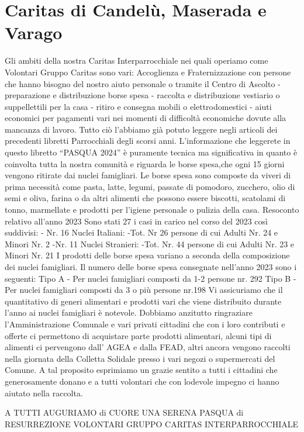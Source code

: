 \section{Caritas di Candelù, Maserada e Varago}
Gli ambiti della nostra Caritas Interparrocchiale nei quali operiamo come Volontari Gruppo Caritas sono vari: Accoglienza e Fraternizzazione con persone che hanno bisogno del nostro aiuto personale o tramite il Centro di Ascolto - preparazione e distribuzione borse spesa - raccolta e distribuzione vestiario o suppellettili per la casa - ritiro e consegna mobili o elettrodomestici - aiuti economici per pagamenti vari nei momenti di difficoltà economiche dovute alla mancanza di lavoro.                         
Tutto ciò l’abbiamo già potuto leggere negli articoli dei precedenti libretti Parrocchiali degli scorsi anni.
L’informazione che leggerete in questo libretto “PASQUA 2024” è puramente tecnica ma significativa in quanto è coinvolta  tutta la nostra comunità e riguarda le borse spesa,che ogni 15 giorni vengono ritirate dai nuclei famigliari.
Le borse spesa sono composte da viveri di prima necessità come pasta, latte, legumi, passate di pomodoro, zucchero, olio di semi e oliva, farina o da altri alimenti che possono essere biscotti, scatolami di tonno, marmellate e prodotti per l’igiene personale o pulizia della casa.
Resoconto relativo all’anno  2023
Sono stati 27 i casi in carico nel corso del 2023 così suddivisi:
- Nr. 16 Nuclei Italiani:
-Tot. Nr  26 persone di cui Adulti Nr. 24  e Minori Nr. 2
-Nr. 11 Nuclei Stranieri:
-Tot. Nr. 44 persone di cui Adulti Nr. 23 e  Minori Nr. 21
I prodotti delle borse spesa variano a seconda della composizione dei nuclei famigliari.
Il numero delle borse spesa consegnate nell’anno 2023 sono i seguenti:
Tipo A - Per nuclei famigliari composti da 1-2 persone nr. 292
Tipo B - Per nuclei famigliari composti da 3 o più persone nr.198
Vi assicuriamo che il quantitativo di generi alimentari e prodotti vari che viene distribuito durante l’anno ai nuclei famigliari è notevole.
Dobbiamo anzitutto ringraziare l’Amministrazione Comunale e vari privati cittadini che con i loro contributi e offerte ci permettono di acquistare parte prodotti alimentari, alcuni tipi di alimenti ci pervengono dall’ AGEA e dalla FEAD, altri ancora vengono raccolti nella giornata della Colletta Solidale presso i vari negozi o supermercati del Comune. A tal proposito esprimiamo un grazie sentito a tutti i cittadini che generosamente donano   e a tutti volontari che con lodevole impegno ci hanno aiutato nella raccolta.

A TUTTI AUGURIAMO di CUORE UNA SERENA PASQUA di RESURREZIONE
VOLONTARI GRUPPO CARITAS INTERPARROCCHIALE
